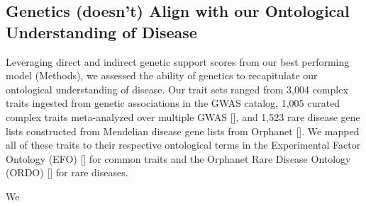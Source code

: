 \subsection{Genetics (doesn't) Align with our Ontological Understanding of Disease}
Leveraging direct and indirect genetic support scores from our best performing model (Methods), we assessed the ability of genetics to recapitulate our ontological understanding of disease. Our trait sets ranged from 3,004 complex traits ingested from genetic associations in the GWAS catalog, 1,005 curated complex traits meta-analyzed over multiple GWAS [], and 1,523 rare disease gene lists constructed from Mendelian disease gene lists from Orphanet []. We mapped all of these traits to their respective ontological terms in the Experimental Factor Ontology (EFO) [] for common traits and the Orphanet Rare Disease Ontology (ORDO) [] for rare diseases.

We 